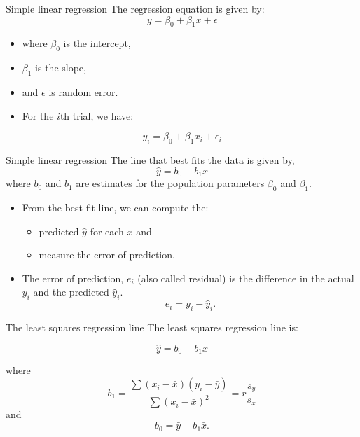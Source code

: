 \documentclass[
  ignorenonframetext,
]{beamer}
\providecommand{\tightlist}{%
  \setlength{\itemsep}{0pt}\setlength{\parskip}{0pt}}
\begin{document}
\begin{frame}{Simple linear regression}
\label{simple-linear-regression-2}
The regression equation is given by: \[y=\beta_0+\beta_1x+\epsilon\]

\begin{itemize}
\item
  where \(\beta_0\) is the intercept,
\item
  \(\beta_1\) is the slope,
\item
  and \(\epsilon\) is random error.
\item
  For the \(i\)th trial, we have:
\end{itemize}

\[y_i=\beta_0+\beta_1x_i+\epsilon_i\]
\end{frame}

\begin{frame}{Simple linear regression}
\label{simple-linear-regression-3}
The line that best fits the data is given by, \[\hat{y}=b_0+b_1x\] where
\(b_0\) and \(b_1\) are estimates for the population parameters
\(\beta_0\) and \(\beta_1\).

\begin{itemize}
\item
  From the best fit line, we can compute the:

  \begin{itemize}
  \tightlist
  \item
    predicted \(\hat{y}\) for each \(x\) and
  \item
    measure the error of prediction.
  \end{itemize}
\item
  The error of prediction, \(e_i\) (also called residual) is the
  difference in the actual \(y_i\) and the predicted \(\hat{y}_i\).
  \[e_i=y_i-\hat{y}_i.\]
\end{itemize}
\end{frame}

\begin{frame}{The least squares regression line}
\label{the-least-squares-regression-line}
The least squares regression line is:

\[\hat{y}=b_0+b_1x\]

where
\[b_1=\frac{\sum(x_i-\bar{x})(y_i-\bar{y})}{\sum(x_i-\bar{x})^2}=r \frac{s_y}{s_x}\]
and \[b_0=\bar{y}-b_1\bar{x}.\]
\end{frame}
\end{document}
